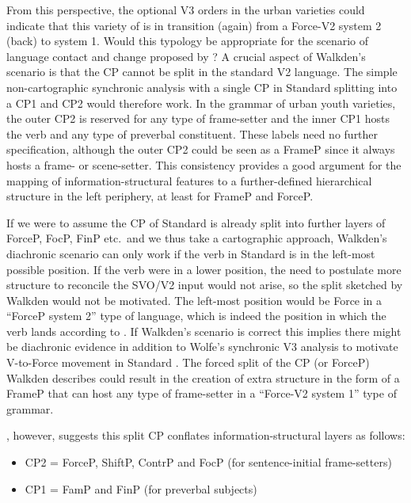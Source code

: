\documentclass[output=paper]{langsci/langscibook}
\begin{document}
From this perspective, the optional V3 orders in the
 urban varieties could indicate that this variety of  is
in transition (again) from a Force-V2 system 2 (back) to system 1. Would this
typology be appropriate for the scenario of language contact and change
proposed by \citet{Walkden:2017}? A crucial aspect of Walkden's scenario is
that the CP cannot be split in the standard V2 language. The
simple non-cartographic synchronic analysis with a single CP in Standard
 splitting into a CP1 and CP2 would therefore work.  In the grammar
of  urban youth varieties, the outer CP2 is reserved for any type of
frame-setter and the inner CP1 hosts the verb and any type of preverbal
constituent. These labels need no further specification, although the outer CP2
could be seen as a FrameP since it always hosts a frame- or scene-setter. This
consistency provides a good argument for the  mapping of information-structural
features to a further-defined hierarchical structure in the left periphery, at
least for FrameP and ForceP.

If we were to assume the CP of Standard  is already split into
further layers of ForceP, FocP, FinP etc.\ and we thus take a cartographic
approach, Walkden's diachronic scenario can only work if the verb in Standard
 is in the left-most possible position. If the verb were in a lower
position, the need to postulate more structure to reconcile the SVO/V2 input
would not arise, so the split sketched by Walkden would not be motivated. The
left-most position would be Force in a \enquote{ForceP system 2} type of
language, which is indeed the position in which the verb lands according to
\citet{Wolfe:2017}. If Walkden's scenario is correct this implies there might
be diachronic evidence in addition to Wolfe's synchronic V3
analysis to motivate V-to-Force movement in Standard
. The forced split of the CP (or ForceP) Walkden describes could
result in the creation of extra structure in the form of a FrameP that can host
any type of frame-setter in a \enquote{Force-V2 system 1} type of grammar.

\textcite{Walkden:2017}, however, suggests this split CP conflates
information-struc\-tural layers as follows:

\begin{itemize}

    \item CP2 = ForceP, ShiftP, ContrP and FocP (for sentence-initial
        frame-setters)

    \item CP1 = FamP and FinP (for preverbal subjects)
\end{itemize}
\end{document}
